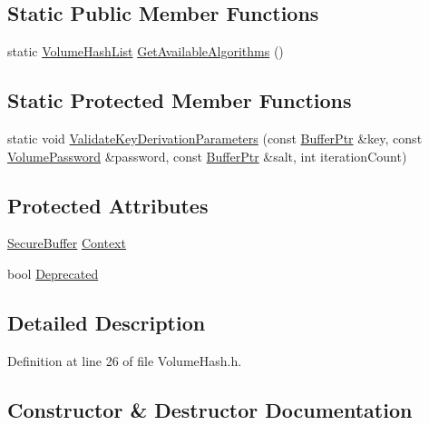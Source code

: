 \subsection*{Static Public Member Functions}
\begin{DoxyCompactItemize}
\item 
static \hyperlink{namespace_gost_crypt_1_1_volume_a513257938e5ea0554ad83d0eb08f8f67}{Volume\+Hash\+List} \hyperlink{class_gost_crypt_1_1_volume_1_1_volume_hash_a1d56ab675cfeb576ccc792edb62343b0}{Get\+Available\+Algorithms} ()
\end{DoxyCompactItemize}
\subsection*{Static Protected Member Functions}
\begin{DoxyCompactItemize}
\item 
static void \hyperlink{class_gost_crypt_1_1_volume_1_1_volume_hash_ade18ec915b02edf8d0ab909ab6858330}{Validate\+Key\+Derivation\+Parameters} (const \hyperlink{class_gost_crypt_1_1_buffer_ptr}{Buffer\+Ptr} \&key, const \hyperlink{class_gost_crypt_1_1_volume_1_1_volume_password}{Volume\+Password} \&password, const \hyperlink{class_gost_crypt_1_1_buffer_ptr}{Buffer\+Ptr} \&salt, int iteration\+Count)
\end{DoxyCompactItemize}
\subsection*{Protected Attributes}
\begin{DoxyCompactItemize}
\item 
\hyperlink{class_gost_crypt_1_1_secure_buffer}{Secure\+Buffer} \hyperlink{class_gost_crypt_1_1_volume_1_1_volume_hash_af86026af3ee2eb5aaf1feb6fac344446}{Context}
\item 
bool \hyperlink{class_gost_crypt_1_1_volume_1_1_volume_hash_aacecbfb38eed1790e8d25a594a4b194e}{Deprecated}
\end{DoxyCompactItemize}


\subsection{Detailed Description}


Definition at line 26 of file Volume\+Hash.\+h.



\subsection{Constructor \& Destructor Documentation}
\mbox{\label{class_gost_crypt_1_1_volume_1_1_volume_hash_a1eaccd0c91cb630b64b14e1e8ad2a455}} 
